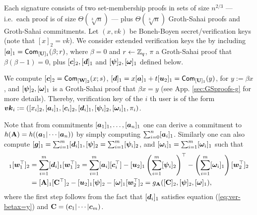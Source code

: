 Each signature consists of two set-membership proofs in sets of size $n^{2/3}$ --- i.e.~each proof is of size $\Theta(\sqrt[3]{n})$ ---  plus $\Theta(\sqrt[3]{n})$ Groth-Sahai proofs and Groth-Sahai commitments.
Let $(x,vk)$ be Boneh-Boyen secret/verification keys (note that $[x]_2=vk$).
We consider extended verification keys the by including $[{\boldsymbol{a}}]_1 = \mathsf{Com}_{[\mathbf{{U}}]_1}(\beta;r)$, where $\beta=0$ and $r\gets\mathbb{Z}_q$, $\pi$ a Groth-Sahai proof that $\beta(\beta-1)=0$, 
plus $[{\boldsymbol{c}}]_2,[{\boldsymbol{d}}]_1$ and $[{\boldsymbol{\psi}}]_2,[{\boldsymbol{\omega}}]_1$ defined below. 

We compute $[{\boldsymbol{c}}]_2=\mathsf{Com}_{[\mathbf{{W}}]_2}(x;s)$, $[{\boldsymbol{d}}]_1 = x[{\boldsymbol{a}}]_1+t[{\boldsymbol{u}}_2]_1=\mathsf{Com}_{[\mathbf{{U}}]_1}(y)$, for $y:=\beta x$, and $[{\boldsymbol{\psi}}]_2,[{\boldsymbol{\omega}}]_1$ is a Groth-Sahai proof that $\beta x = y$ (see App. \ref{sec:GSproofs-g} for more details). Thereby, verification key of the $i$ th user is of the form ${\boldsymbol{vk}}_i:=([x_i]_2,[{\boldsymbol{a}}_i]_1,[{\boldsymbol{c}}_i]_2,[{\boldsymbol{d}}_i]_1,[{\boldsymbol{\psi}}_i]_2,[{\boldsymbol{\omega}}_i]_1,\pi_i)$.

Note that from commitments $[{\boldsymbol{a}}_1]_1,\ldots,[{\boldsymbol{a}}_n]_1$ one can derive a commitment to $h(\mathbf{{A}})=h(({\boldsymbol{a}}_1|\cdots|{\boldsymbol{a}}_n))$ by simply computing $\sum_{i=0}^n [{\boldsymbol{a}}_i]_1$. Similarly one can also compute $[{\boldsymbol{g}}]_1 = \sum_{i=1}^m[{\boldsymbol{d}}_i]_1,[{\boldsymbol{\psi}}]_2 = \sum_{i=1}^m [{\boldsymbol{\psi}}_i]_2$, and $[{\boldsymbol{\omega}}_i]_1 = \sum_{i=1}^m [{\boldsymbol{\omega}}_i]_1$ such that
\begin{align*}
[\vecb{g}]_1[\vecb{w}_1^\top]_2 &= \sum_{i=1}^m [\vecb{d}_i]_1[\vecb{w}_1^\top]_2
= \sum_{i=1}^m [\vecb{a}_i][\vecb{c}_i^\top] - [\vecb{u}_2]_1\left(\sum_{i=1}^m[\vecb{\psi}_i]_2\right)^\top  -\left(\sum_{i=1}^m[\vecb{\omega}_i]_1\right)[\vecb{w}_2^\top]_2\\
&= [\matr{A}]_1[\matr{C}^\top]_2 - [\vecb{u}_2]_1[\vecb{\psi}]_2 - [\vecb{\omega}]_1[\vecb{w}_2^\top]_2
= g_{\matr{A}}([\matr{C}]_2,[\vecb{\psi}]_2,[\vecb{\omega}]_1),
\end{align*}
where the first step follows from the fact that $[{\boldsymbol{d}}_i]_1$ satisfies equation (\ref{eq:ver-betax=y}) and $\mathbf{{C}}=({\boldsymbol{c}}_1|\cdots|{\boldsymbol{c}}_m)$. %

